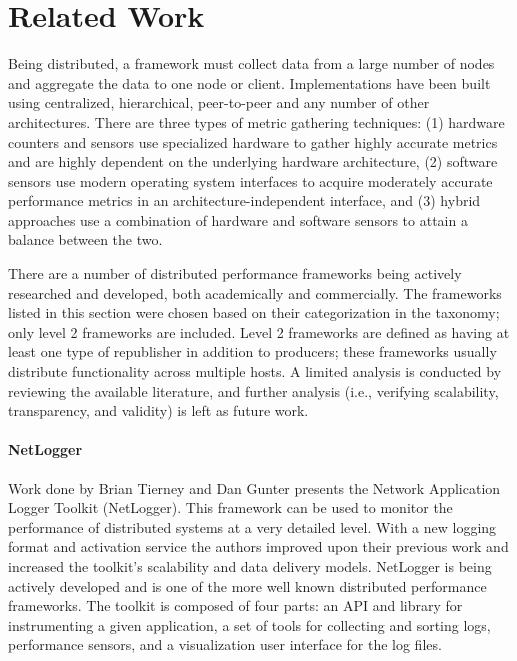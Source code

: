 \chapter{Related Work}
\label{related_work}

Being distributed, a framework must collect data from a large number of nodes and aggregate the data to one node or
client. Implementations have been built using centralized, hierarchical, peer-to-peer and any number of other
architectures. There are three types of metric gathering techniques: (1) hardware counters and sensors use specialized
hardware to gather highly accurate metrics and are highly dependent on the underlying hardware architecture, (2)
software sensors use modern operating system interfaces to acquire moderately accurate performance metrics in an
architecture-independent interface, and (3) hybrid approaches use a combination of hardware and software sensors to
attain a balance between the two.

There are a number of distributed performance frameworks being actively researched and developed, both academically and
commercially. The frameworks listed in this section were chosen based on their categorization in the
\cite{zanikolas2005} taxonomy; only level 2 frameworks are included. Level 2 frameworks are defined as having at least
one type of republisher in addition to producers; these frameworks usually distribute functionality across multiple
hosts. \cite{zanikolas2005} A limited analysis is conducted by reviewing the available literature, and further analysis
(i.e., verifying scalability, transparency, and validity) is left as future work.

\subsubsection{NetLogger}

Work done by Brian Tierney and Dan Gunter \cite{tierney1998} \cite{gunter2000} presents the Network Application Logger
Toolkit (NetLogger). This framework can be used to monitor the performance of distributed systems at a very detailed
level. With a new logging format and activation service \cite{gunter2002} the authors improved upon their previous work
and increased the toolkit's scalability and data delivery models. NetLogger is being actively developed and is one of
the more well known distributed performance frameworks. The toolkit is composed of four parts: an API and library for
instrumenting a given application, a set of tools for collecting and sorting logs, performance sensors, and a
visualization user interface for the log files.

